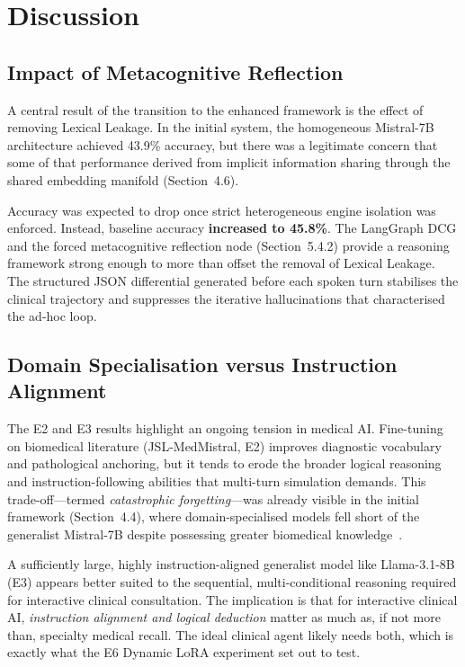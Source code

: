 \chapter{Discussion}
\label{Chapter7}


\section{Impact of Metacognitive Reflection}

A central result of the transition to the enhanced framework is the effect of removing Lexical Leakage. In the initial system, the homogeneous Mistral-7B architecture achieved 43.9\% accuracy, but there was a legitimate concern that some of that performance derived from implicit information sharing through the shared embedding manifold (Section~4.6).

Accuracy was expected to drop once strict heterogeneous engine isolation was enforced. Instead, baseline accuracy \textbf{increased to 45.8\%}. The LangGraph DCG and the forced metacognitive reflection node (Section~5.4.2) provide a reasoning framework strong enough to more than offset the removal of Lexical Leakage. The structured JSON differential generated before each spoken turn stabilises the clinical trajectory and suppresses the iterative hallucinations that characterised the ad-hoc loop.

\section{Domain Specialisation versus Instruction Alignment}

The E2 and E3 results highlight an ongoing tension in medical AI. Fine-tuning on biomedical literature (JSL-MedMistral, E2) improves diagnostic vocabulary and pathological anchoring, but it tends to erode the broader logical reasoning and instruction-following abilities that multi-turn simulation demands. This trade-off---termed \textit{catastrophic forgetting}---was already visible in the initial framework (Section~4.4), where domain-specialised models fell short of the generalist Mistral-7B despite possessing greater biomedical knowledge~\cite{tang2023medagents}.

A sufficiently large, highly instruction-aligned generalist model like Llama-3.1-8B (E3) appears better suited to the sequential, multi-conditional reasoning required for interactive clinical consultation. The implication is that for interactive clinical AI, \textit{instruction alignment and logical deduction} matter as much as, if not more than, specialty medical recall. The ideal clinical agent likely needs both, which is exactly what the E6 Dynamic LoRA experiment set out to test.

